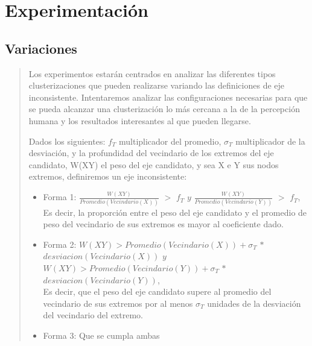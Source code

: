 \documentclass[8pt,a4paper]{article}
\begin{document}
\section{Experimentación}
\subsection{Variaciones}
\begin{verse}
Los experimentos estarán centrados en analizar las diferentes tipos clusterizaciones que pueden realizarse variando las definiciones de eje inconsistente. Intentaremos analizar las configuraciones necesarias para que se pueda alcanzar una clusterización lo más cercana a la de la percepción humana y los resultados interesantes al que pueden llegarse.

Dados los siguientes: $f_{T}$ multiplicador del promedio, $\sigma_{T}$ multiplicador de la desviación, y la profundidad del vecindario de los extremos del eje candidato, W(XY) el peso del eje candidato, y sea X e Y sus nodos extremos, definiremos un eje inconsistente:
\begin{itemize}
\item Forma 1: $\frac{W(XY)}{Promedio(Vecindario(X))}$ $>$ $f_{T}$ $  y $ $\frac{W(XY)}{Promedio(Vecindario(Y))}$ $>$ $f_{T}$, \\Es decir, la proporción entre el peso del eje candidato y el promedio de peso del vecindario de sus extremos es mayor al coeficiente dado.
\item Forma 2: $W(XY) >  Promedio(Vecindario(X)) + \sigma_{T}$ $ * $ $ desviacion(Vecindario(X)) $ $ y$ $W(XY) >  Promedio(Vecindario(Y)) + \sigma_{T}$ $ * $ $ desviacion(Vecindario(Y)) $, \\Es decir, que el peso del eje candidato supere al promedio del vecindario de sus extremos por al menos $\sigma_{T}$ unidades de la desviación del vecindario del extremo.

\item Forma 3: Que se cumpla ambas
\end{itemize}





\end{verse}
\end{document}
